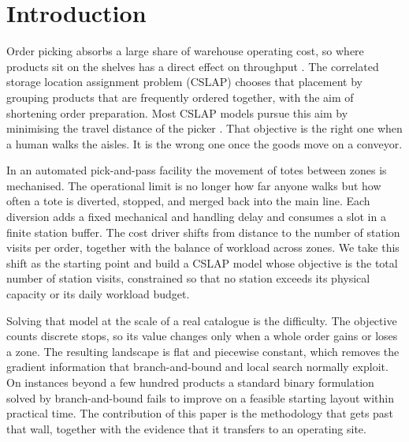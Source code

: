 \documentclass[]{interact}
\begin{document}
\section{Introduction}
Order picking absorbs a large share of warehouse operating cost, so where products sit on the shelves has a direct effect on throughput \citep{xie2024combi}. The correlated storage location assignment problem (CSLAP) chooses that placement by grouping products that are frequently ordered together, with the aim of shortening order preparation. Most CSLAP models pursue this aim by minimising the travel distance of the picker \citep{islam2023}. That objective is the right one when a human walks the aisles. It is the wrong one once the goods move on a conveyor.

In an automated pick-and-pass facility the movement of totes between zones is mechanised. The operational limit is no longer how far anyone walks but how often a tote is diverted, stopped, and merged back into the main line. Each diversion adds a fixed mechanical and handling delay and consumes a slot in a finite station buffer. The cost driver shifts from distance to the number of station visits per order, together with the balance of workload across zones. We take this shift as the starting point and build a CSLAP model whose objective is the total number of station visits, constrained so that no station exceeds its physical capacity or its daily workload budget.

Solving that model at the scale of a real catalogue is the difficulty. The objective counts discrete stops, so its value changes only when a whole order gains or loses a zone. The resulting landscape is flat and piecewise constant, which removes the gradient information that branch-and-bound and local search normally exploit. On instances beyond a few hundred products a standard binary formulation solved by branch-and-bound fails to improve on a feasible starting layout within practical time. The contribution of this paper is the methodology that gets past that wall, together with the evidence that it transfers to an operating site.
\end{document}
